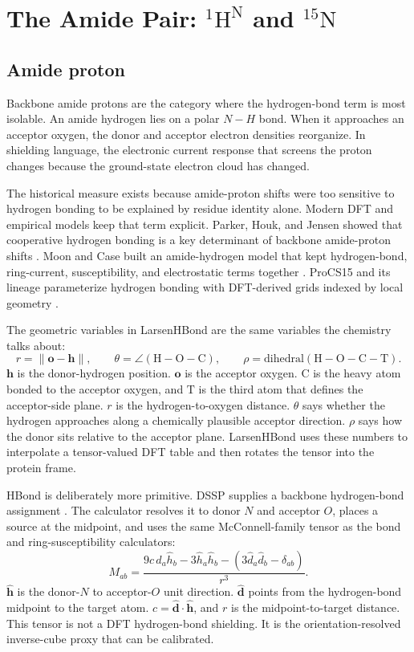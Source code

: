 \documentclass[11pt]{article}
\begin{document}
\section{\texorpdfstring{The Amide Pair: \(^{1}\mathrm H^\mathrm N\)
and \(^{15}\mathrm N\)}{The Amide Pair: 1HN and 15N}}

\subsection{Amide proton}

Backbone amide protons are the category where the hydrogen-bond term is most isolable. An amide
hydrogen lies on a polar \(N-H\) bond. When it approaches an acceptor oxygen,
the donor and acceptor electron densities reorganize. In shielding language,
the electronic current response that screens the proton changes because the
ground-state electron cloud has changed.

The historical measure exists because amide-proton shifts were too sensitive to
hydrogen bonding to be explained by residue identity alone. Modern DFT and
empirical models keep that term explicit. Parker, Houk, and Jensen showed that
cooperative hydrogen bonding is a key determinant of backbone amide-proton
shifts \cite{parker2006}. Moon and Case built an amide-hydrogen model that
kept hydrogen-bond, ring-current, susceptibility, and electrostatic terms
together \cite{mooncase2007}. ProCS15 and its lineage parameterize hydrogen
bonding with DFT-derived grids indexed by local geometry \cite{larsen2015}.

The geometric variables in LarsenHBond are the same variables the chemistry
talks about:
\[
  r=\|\bm o-\bm h\|,
  \qquad
  \theta=\angle(\mathrm H-\mathrm O-\mathrm C),
  \qquad
  \rho=\mathrm{dihedral}(\mathrm H-\mathrm O-\mathrm C-\mathrm T).
\]
\(\bm h\) is the donor-hydrogen position. \(\bm o\) is the acceptor oxygen.
\(\mathrm C\) is the heavy atom bonded to the acceptor oxygen, and
\(\mathrm T\) is the third atom that defines the acceptor-side plane. \(r\) is
the hydrogen-to-oxygen distance. \(\theta\) says whether the hydrogen approaches
along a chemically plausible acceptor direction. \(\rho\) says how the donor
sits relative to the acceptor plane. LarsenHBond uses these numbers to
interpolate a tensor-valued DFT table and then rotates the tensor into the
protein frame.

HBond is deliberately more primitive. DSSP supplies a backbone hydrogen-bond
assignment \cite{kabsch1983}. The calculator resolves it to donor \(N\) and
acceptor \(O\), places a source at the midpoint, and uses the same
McConnell-family tensor as the bond and ring-susceptibility calculators:
\[
  M_{ab}
  =
  \frac{
    9c\,\hat d_a\hat h_b
    -3\hat h_a\hat h_b
    -\left(3\hat d_a\hat d_b-\delta_{ab}\right)}
  {r^3}.
\]
\(\hat{\bm h}\) is the donor-\(N\) to acceptor-\(O\) unit direction.
\(\hat{\bm d}\) points from the hydrogen-bond midpoint to the target atom.
\(c=\hat{\bm d}\cdot\hat{\bm h}\), and \(r\) is the midpoint-to-target
distance. This tensor is not a DFT hydrogen-bond shielding. It is the
orientation-resolved inverse-cube proxy that can be calibrated.
\end{document}
